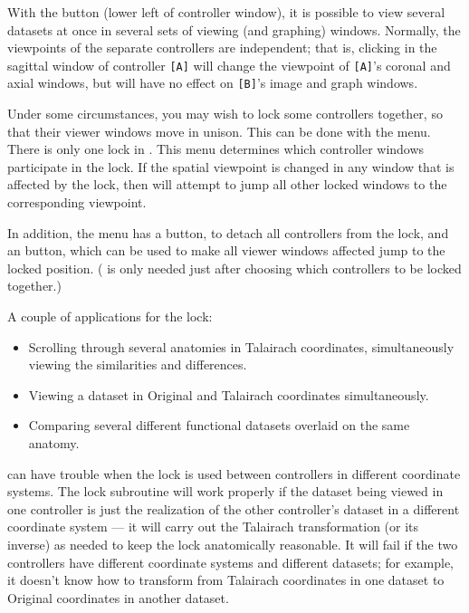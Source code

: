 With the  button (lower left of \afnit controller window),
it is possible to view several datasets at once in several sets of
viewing (and graphing) windows.
Normally, the viewpoints of the separate controllers are independent;
that is, clicking in the sagittal window of controller {\tt [A]}
will change the viewpoint of {\tt [A]}'s coronal and axial windows,
but will have no effect on {\tt [B]}'s image and graph windows.

Under some circumstances, you may wish to lock some controllers
together, so that their viewer windows move in unison.  This can
be done with the  menu.  There is only one lock
in \afni.  This menu determines which controller windows participate
in the lock.  If the spatial viewpoint is changed in any
window that is affected by the lock, then \afnit will attempt
to jump all other locked windows to the corresponding viewpoint.

In addition, the  menu has a  button,
to detach all controllers from the lock, and an 
button, which can be used to make all viewer windows affected jump
to the locked position.  ( is only needed just after choosing
which controllers to be locked together.)

A couple of applications for the lock:
\begin{itemize}
  \item Scrolling
        through several anatomies in Talairach coordinates, simultaneously
        viewing the similarities and differences.

  \item Viewing a dataset in Original and Talairach coordinates simultaneously.

  \item Comparing several different functional datasets overlaid on the
        same anatomy.
\end{itemize}
\afnit can have trouble when the lock is used between controllers
in different coordinate systems.  The lock subroutine will work properly
if the dataset being viewed in one controller is just the realization
of the other controller's dataset in a different coordinate system --- it
will carry out the Talairach transformation (or its inverse) as needed
to keep the lock anatomically reasonable.
It will fail if the two controllers have different coordinate systems
and different datasets; for example, it doesn't know how to transform
from Talairach coordinates in one dataset to Original coordinates
in another dataset.

